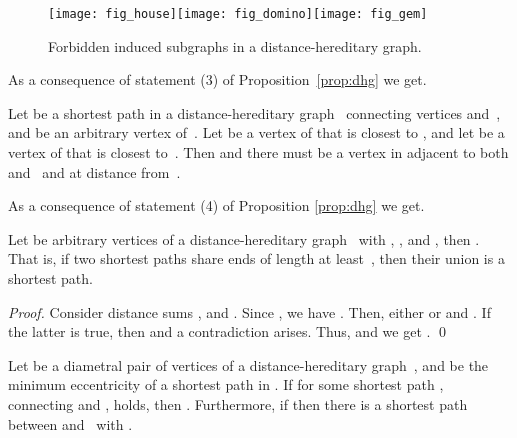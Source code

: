 \documentclass[10pt]{llncs}
\begin{document}
\begin{figure}
    [htb]
    \centering
    \texttt{[image: fig\_house]}\hspace*{1cm}\texttt{[image: fig\_domino]}\hspace*{1cm}\texttt{[image: fig\_gem]}\caption
    {
        Forbidden induced subgraphs in a distance-hereditary graph. 
    }
    \label{fig:dhg} \end{figure}

As a consequence of statement (3) of Proposition~\ref{prop:dhg} we get. 

\begin{corollary}
    \label{cor:pr-size} 
Let  be a shortest path in a distance-hereditary graph~ connecting vertices  and~, and  be an arbitrary vertex of~. 
Let  be a vertex of  that is closest to , and let  be a vertex of  that is closest to~. 
Then  and there must be a vertex  in  adjacent to both  and~ and at distance  from~. 
\end{corollary}

As a consequence of statement (4) of Proposition \ref{prop:dhg} we get. 

\begin{corollary}
    \label{cor:two-paths} 
Let  be arbitrary vertices of a distance-hereditary graph~ with , , and , then . 
That is, if two shortest paths share ends of length at least~, then their union is a shortest path. 
\end{corollary} 

\begin{proof}
Consider distance sums ,  and . 
Since , we have . 
Then, either  or  and . 
If the latter is true, then  and a contradiction arises.
Thus,  and we get .
\qed
\end{proof}


\begin{lemma}
    \label{lm:dhg} 
Let  be a diametral pair of vertices of a distance-hereditary graph~, and  be the minimum eccentricity of a shortest path in . 
If for some shortest path , connecting  and ,  holds, then . 
Furthermore, if  then there is a shortest path  between  and~ with . 
\end{lemma} 
\end{document}
